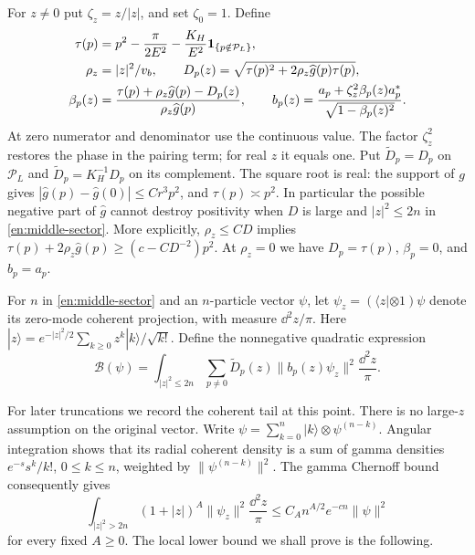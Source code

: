 For $z\ne0$ put $\zeta_z=z/|z|$, and set $\zeta_0=1$.  Define
\begin{align}
 \tau(p)&=p^2-\frac\pi{2E^2}-\frac{K_H}{E^2}
                       \mathbf 1_{\{p\notin\mathcal P_L\}},\label{en:tau}\\
 \rho_z&=|z|^2/v_b,\qquad
 D_p(z)=\sqrt{\tau(p)^2+2\rho_z\widehat g(p)\tau(p)},\nonumber\\
 \beta_p(z)&=\frac{\tau(p)+\rho_z\widehat g(p)-D_p(z)}
                   {\rho_z\widehat g(p)},\qquad
 b_p(z)=\frac{a_p+\zeta_z^2\beta_p(z)a_p^*}{\sqrt{1-\beta_p(z)^2}}.
 \label{en:bogoliubov}
\end{align}
At zero numerator and denominator use the continuous value.  The factor
$\zeta_z^2$ restores the phase in the pairing term; for real $z$ it
equals one.  Put $\widetilde D_p=D_p$ on $\mathcal P_L$ and
$\widetilde D_p=K_H^{-1}D_p$ on its complement.  The square root is real:
the support of $g$ gives
$|\widehat g(p)-\widehat g(0)|\le Cr^3p^2$, and
$\tau(p)\asymp p^2$.  In particular the possible negative part of
$\widehat g$ cannot destroy positivity when $D$ is large and
$|z|^2\le2n$ in \eqref{en:middle-sector}.
More explicitly, $\rho_z\le CD$ implies
$\tau(p)+2\rho_z\widehat g(p)\ge(c-CD^{-2})p^2$.
At $\rho_z=0$ we have $D_p=\tau(p)$, $\beta_p=0$, and $b_p=a_p$.

For $n$ in \eqref{en:middle-sector} and an $n$-particle vector
$\psi$, let
$\psi_z=(\langle z|\otimes1)\psi$ denote its zero-mode coherent
projection, with measure $\dd^2z/\pi$.  Here
$|z\rangle=e^{-|z|^2/2}\sum_{k\ge0}z^k|k\rangle/\sqrt{k!}$.
Define the nonnegative quadratic expression
\begin{equation}\label{en:bog-energy}
 \mathcal B(\psi)=\int_{|z|^2\le2n}
       \sum_{p\ne0}\widetilde D_p(z)\|b_p(z)\psi_z\|^2
                                  \frac{\dd^2z}{\pi}.
\end{equation}

For later truncations we record the coherent tail at this point.
There is no large-$z$ assumption on the original vector.  Write
$\psi=\sum_{k=0}^n|k\rangle\otimes\psi^{(n-k)}$.  Angular integration
shows that its radial coherent density is a sum of gamma densities
$e^{-s}s^k/k!$, $0\le k\le n$, weighted by
$\|\psi^{(n-k)}\|^2$.  The gamma Chernoff bound consequently gives
\begin{equation}\label{en:coherent-tail}
 \int_{|z|^2>2n}(1+|z|)^A\|\psi_z\|^2
       \frac{\dd^2z}{\pi}\le C_A n^{A/2}e^{-cn}\|\psi\|^2
\end{equation}
for every fixed $A\ge0$.
The local lower bound we shall prove is the following.


